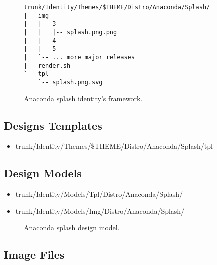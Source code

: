 
\begin{figure}[!hbp]
\hrulefill
\begin{verbatim}
trunk/Identity/Themes/$THEME/Distro/Anaconda/Splash/
|-- img
|   |-- 3
|   |   |-- splash.png.png
|   |-- 4
|   |-- 5
|   `-- ... more major releases
|-- render.sh
`-- tpl
    `-- splash.png.svg
\end{verbatim}
\hrulefill
\caption{Anaconda splash identity's framework.%
   \label{fig:Distribution:Anaconda:Splash:Identity}}
\end{figure}

\subsection{Designs Templates}
\hypertarget{sec:Distribution:Anaconda:Splash:Identity:Templates}{}
\label{sec:Distribution:Anaconda:Splash:Identity:Templates}

\begin{itemize}
\item trunk/Identity/Themes/\$THEME/Distro/Anaconda/Splash/tpl
\end{itemize}

\subsection{Design Models}

\begin{itemize}
\item trunk/Identity/Models/Tpl/Distro/Anaconda/Splash/
\item trunk/Identity/Models/Img/Distro/Anaconda/Splash/
\end{itemize}

\begin{figure}[!hbp]
\begin{center}
\end{center}
\caption{Anaconda splash design model.%
   \label{fig:Distribution:Anaconda:Splash:Models:Fig1}}
\end{figure}

\subsection{Image Files}
\hypertarget{sec:Distribution:Anaconda:Splash:Identity:Images}{}
\label{sec:Distribution:Anaconda:Splash:Identity:Images}

